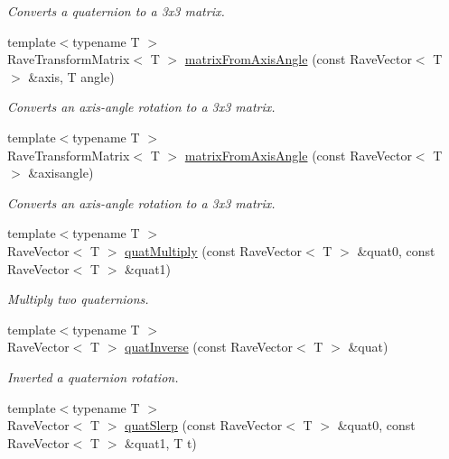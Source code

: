 \begin{DoxyCompactItemize}
\begin{DoxyCompactList}\small\item\em Converts a quaternion to a 3x3 matrix. \item\end{DoxyCompactList}\item 
{\footnotesize template$<$typename T $>$ }\\RaveTransformMatrix$<$ T $>$ \hyperlink{group__affine__math_gad596e9d743a4d08e54db0f01b1657002}{matrixFromAxisAngle} (const RaveVector$<$ T $>$ \&axis, T angle)
\begin{DoxyCompactList}\small\item\em Converts an axis-\/angle rotation to a 3x3 matrix. \item\end{DoxyCompactList}\item 
{\footnotesize template$<$typename T $>$ }\\RaveTransformMatrix$<$ T $>$ \hyperlink{group__affine__math_ga25cf5562e674415477d2bcd80f95cc5b}{matrixFromAxisAngle} (const RaveVector$<$ T $>$ \&axisangle)
\begin{DoxyCompactList}\small\item\em Converts an axis-\/angle rotation to a 3x3 matrix. \item\end{DoxyCompactList}\item 
{\footnotesize template$<$typename T $>$ }\\RaveVector$<$ T $>$ \hyperlink{group__affine__math_gac36d0b93e56274bdfb6e1e648b829536}{quatMultiply} (const RaveVector$<$ T $>$ \&quat0, const RaveVector$<$ T $>$ \&quat1)
\begin{DoxyCompactList}\small\item\em Multiply two quaternions. \item\end{DoxyCompactList}\item 
{\footnotesize template$<$typename T $>$ }\\RaveVector$<$ T $>$ \hyperlink{group__affine__math_ga7aa03948b7cc76653b754376dcd55bae}{quatInverse} (const RaveVector$<$ T $>$ \&quat)
\begin{DoxyCompactList}\small\item\em Inverted a quaternion rotation. \item\end{DoxyCompactList}\item 
{\footnotesize template$<$typename T $>$ }\\RaveVector$<$ T $>$ \hyperlink{group__affine__math_gab1abf41daa0f130493c4a0591b03b4ec}{quatSlerp} (const RaveVector$<$ T $>$ \&quat0, const RaveVector$<$ T $>$ \&quat1, T t)

\end{DoxyCompactItemize}
